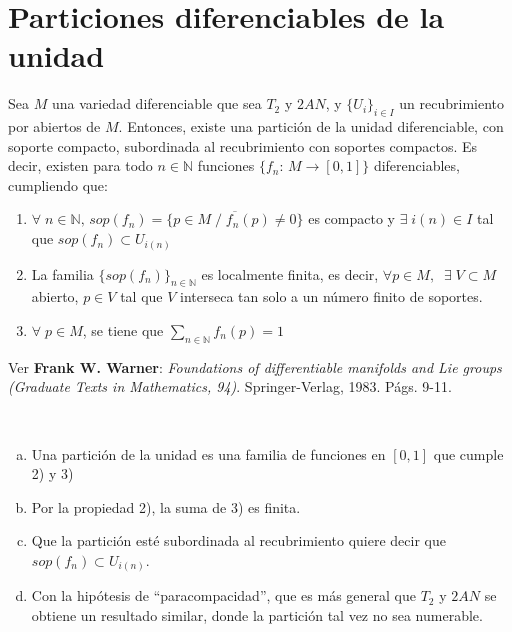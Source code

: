 \section{Particiones diferenciables de la unidad}
\begin{teo}
Sea $M$ una variedad diferenciable que sea $T_2$ y $2AN$, y $\{U_i\}_{i\in I}$ un recubrimiento por abiertos de $M$. Entonces, existe una partición de la unidad diferenciable, con soporte compacto, subordinada al recubrimiento con soportes compactos. Es decir, existen para todo $n\in \mathbb{N}$ funciones $\{f_n:\,M\longrightarrow [0,1]\}$ diferenciables, cumpliendo que:
\begin{enumerate}[1)]
    \item $\forall\; n\in \mathbb{N}, \, sop(f_n) = \overline{\{p \in M\; / \; f_n(p) \neq 0\}}$ es compacto y $\exists\; i(n) \in I$ tal que $sop(f_n)\subset U_{i(n)}$
    \item La familia $\{sop(f_n)\}_{n\in\mathbb{N}}$ es localmente finita, es decir, $\forall p \in M,\;\;\exists\; V \subset M$ abierto, $p \in V$ tal que $V$ interseca tan solo a un número finito de soportes.
    \item $\forall \; p \in M$, se tiene que $\underset{n \in \mathbb{N}}{\sum} f_n(p) = 1$
\end{enumerate}
\begin{dem}
    Ver \textbf{Frank W. Warner}: \textit{Foundations of differentiable manifolds and Lie groups (Graduate Texts in Mathematics, 94)}. Springer-Verlag, 1983. Págs. 9-11. 
\end{dem}
\end{teo}
\begin{obss} \, 
    \begin{enumerate}[a)]
        \item Una partici\'on de la unidad es una familia de funciones en $[0,1]$ que cumple 2) y 3)
        \item Por la propiedad 2), la suma de 3) es finita.
        \item Que la partici\'on est\'e subordinada al recubrimiento quiere decir que $sop(f_n) \subset U_{i(n)}$.
        \item Con la hip\'otesis de ``paracompacidad'', que es m\'as general que $T_2$ y $2AN$ se obtiene un resultado similar, donde la partici\'on tal vez no sea numerable.
    \end{enumerate}
\end{obss}

